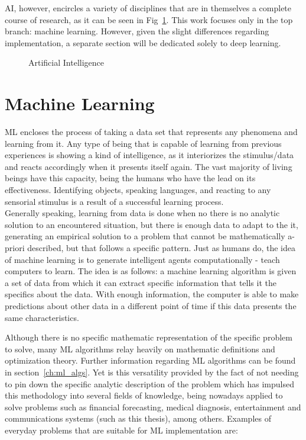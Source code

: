 \ac{AI}, however, encircles a variety of disciplines that are in themselves a complete course of research, as it can be seen in Fig~\ref{fig:ai}. This work focuses only in the top branch: machine learning. However, given the slight differences regarding implementation, a separate section will be dedicated solely to deep learning.

\begin{figure}[htb]
    \centering
      
      \caption{Artificial Intelligence}
      \label{fig:ai}
\end{figure}

\section{Machine Learning}
\ac{ML} encloses the process of taking a data set that represents any phenomena and learning from it. Any type of being that is capable of learning from previous experiences is showing a kind of intelligence, as it interiorizes the stimulus/data and reacts accordingly when it presents itself again. The vast majority of living beings have this capacity, being the humans who have the lead on its effectiveness. Identifying objects, speaking languages, and reacting to any sensorial stimulus is a result of a successful learning process. \\

Generally speaking, learning from data is done when no there is no analytic solution to an encountered situation, but there is enough data to adapt to the it, generating an empirical solution to a problem that cannot be mathematically a-priori described, but that follows a specific pattern\cite{Yaser}. Just as humans do, the idea of machine learning is to generate intelligent agents computationally - teach computers to learn. The idea is as follows: a machine learning algorithm is given a set of data from which it can extract specific information that tells it the specifics about the data. With enough information, the computer is able to make predictions about other data in a different point of time if this data presents the same characteristics.

Although there is no specific mathematic representation of the specific problem to solve, many \ac{ML} algorithms relay heavily on mathematic definitions and optimization theory. Further information regarding \ac{ML} algorithms can be found in section~\ref{ch:ml_algs}. Yet is this versatility provided by the fact of not needing to pin down the specific analytic description of the problem which has impulsed this methodology into several fields of knowledge, being nowadays applied to solve problems such as financial forecasting\cite{Bose2001}, medical diagnosis\cite{Kononenko2001}, entertainment\cite{Bennett2007} and communications systems (such as this thesis), among others. Examples of everyday problems that are suitable for \ac{ML} implementation are:

